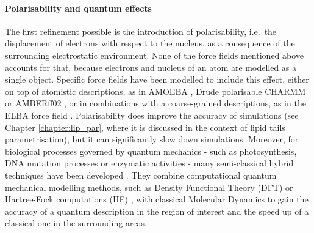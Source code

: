 \paragraph{Polarisability and quantum effects}
The first refinement possible is the introduction of polarisability, i.e.\ the displacement of electrons with respect to the nucleus, as a consequence of the surrounding electrostatic environment. None of the force fields mentioned above accounts for that, because electrons and nucleus of an atom are modelled as a single object. Specific force fields have been modelled to include this effect, either on top of atomistic descriptions, as in AMOEBA \citep{Ren2003,Ponder2010}, Drude polarisable CHARMM \citep{Anisimov2004} or AMBERff02 \citep{Cieplak2001}, or in combinations with a coarse-grained descriptions, as in the ELBA force field \citep{Orsi2011}. Polarisability does improve the accuracy of simulations (see Chapter \ref{chapter:lip_par}, where it is discussed in the context of lipid tails parametrisation), but it can significantly slow down simulations.
%
Moreover, for biological processes governed by quantum mechanics - such as photosynthesis, DNA mutation processes or enzymatic activities - many semi-classical hybrid techniques have been developed \citep{Ahmadi2018}. They combine computational quantum mechanical modelling methods, such as Density Functional Theory (DFT) or Hartree-Fock computations (HF) \citep{Shao2015}, with classical Molecular Dynamics to gain the accuracy of a quantum description in the region of interest and the speed up of a classical one in the surrounding areas.


